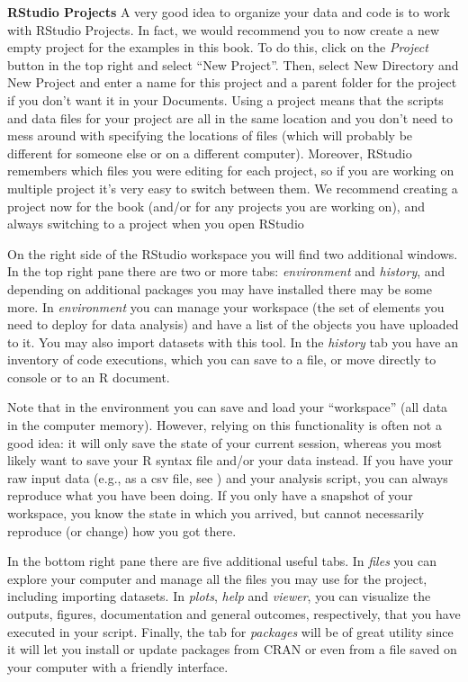 \begin{feature}
  \textbf{RStudio Projects}
  A very good idea to organize your data and code is to work with RStudio Projects.
  In fact, we would recommend you to now create a new empty project for the examples in this book.
  To do this, click on the \emph{Project} button in the top right and select ``New Project''.
  Then, select New Directory and New Project and enter a name for this project
  and a parent folder for the project if you don't want it in your Documents. 
  Using a project means that the scripts and data files for your project are all in the same location
  and you don't need to mess around with specifying the locations of files
  (which will probably be different for someone else or on a different computer).
  Moreover, RStudio remembers which files you were editing for each project,
  so if you are working on multiple project it's very easy to switch between them.
  We recommend creating a project now for the book (and/or for any projects you are working on),
  and always switching to a project when you open RStudio
\end{feature}


On the right side of the RStudio workspace you will find two additional
windows. In the top right pane there are two or more tabs:
\emph{environment} and \emph{history}, and depending on additional
packages you may have installed there may be some more.  In
\emph{environment} you can manage your workspace (the set of elements
you need to deploy for data analysis) and have a list of the objects
you have uploaded to it. You may also import datasets with this tool.
In the \emph{history} tab you
have an inventory of code executions, which you can save to a file, or
move directly to console or to an R document.

Note that in the environment you can save and load your ``workspace'' (all data in the computer memory).
However, relying on this functionality is often not a good idea: it
will only save the state of your current session, whereas you most
likely want to save your R syntax file and/or your data instead.
If you have your raw input data (e.g., as a csv file, see )
and your analysis script, you can always
reproduce what you have been doing. If you only have a snapshot of
your workspace, you know the state in which you arrived, but cannot
necessarily reproduce (or change) how you got there.

In the bottom right pane there are five additional useful tabs.
In \emph{files} you can explore
your computer and manage all the files you may use for the project,
including importing datasets. In \emph{plots}, \emph{help} and
\emph{viewer}, you can visualize the  outputs, figures, documentation
and general outcomes, respectively, that you have executed in your
script. Finally, the tab for \emph{packages} will be of great
utility since it will let you install or update packages from CRAN or
even from a file saved on your computer with a friendly interface.


